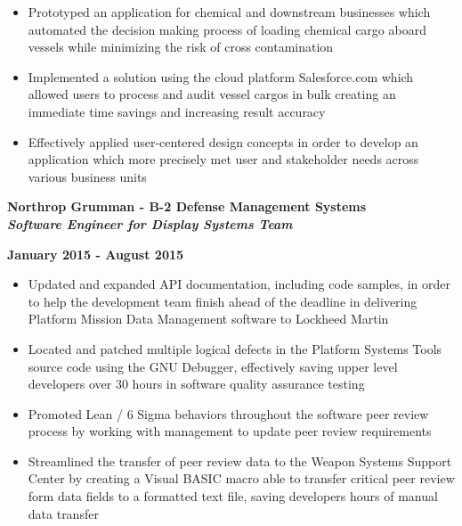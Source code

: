 \documentclass[10pt,letterpaper]{article}
\begin{document}
        \begin{itemize}[noitemsep,topsep=0pt]
          \setlength\itemsep{-0.10em}
        \item Prototyped an application for chemical and downstream
          businesses which automated the decision making process of
          loading chemical cargo aboard vessels while minimizing the
          risk of cross contamination
        \item Implemented a solution using the cloud platform
          Salesforce.com which allowed users to process and audit
          vessel cargos in bulk creating an immediate time savings and
          increasing result accuracy
        \item Effectively applied user-centered design concepts in
          order to develop an application which more precisely met
          user and stakeholder needs across various business units
          
        \end{itemize}

        \medskip
	
        \begin{minipage}[t]{0.53\textwidth}
          \begin{flushleft}
            \textbf{Northrop Grumman - B-2 Defense Management Systems}\\
            \textbf{\textit{Software Engineer for Display Systems Team}}\\
          \end{flushleft}
        \end{minipage}
        \begin{minipage}[t]{0.44\textwidth}
          \begin{flushright}
            \textbf{January 2015 - August 2015}
          \end{flushright}
        \end{minipage}
	
	\begin{itemize}[noitemsep,topsep=0pt]
          \setlength\itemsep{-0.10em}
        \item Updated and expanded API documentation, including code
          samples, in order to help the development team finish ahead
          of the deadline in delivering Platform Mission Data
          Management software to Lockheed Martin
        \item Located and patched multiple logical defects in the
          Platform Systems Tools source code using the GNU Debugger,
          effectively saving upper level developers over 30 hours in
          software quality assurance testing
        \item Promoted Lean / 6 Sigma behaviors throughout the
          software peer review process by working with management to
          update peer review requirements
        \item Streamlined the transfer of peer review data to the
          Weapon Systems Support Center by creating a Visual BASIC
          macro able to transfer critical peer review form data fields
          to a formatted text file, saving developers hours of manual
          data transfer
	\end{itemize}
	
\end{document}
